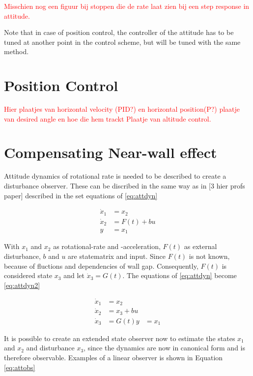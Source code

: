 \textcolor{red}{Misschien nog een figuur bij stoppen die de rate laat zien bij een step response in attitude.}

Note that in case of position control, the controller of the attitude has to be tuned at another point in the control scheme, but will be tuned with the same method.

\section{Position Control}
\textcolor{red}{Hier plaatjes van horizontal velocity (PID?) en  horizontal position(P?)}
\textcolor{red}{plaatje van desired angle en hoe die hem trackt}
\textcolor{red}{Plaatje van altitude control.}


\section{Compensating Near-wall effect}
Attitude dynamics of rotational rate is needed to be described to create a disturbance observer. These can be discribed in the same way as in [3 hier profs paper] described in the set equations of \ref{eq:attdyn}

\begin{equation} \label{eq:attdyn}
\begin{aligned}
\dot{x}_1 &= x_2 \\
\dot{x}_2 &= F(t)+bu \\
y 		  &=x_1 
\end{aligned}
\end{equation}

With $x_1$ and $x_2$ as rotational-rate and -acceleration, $F(t)$ as external disturbance, $b$ and $u$ are statematrix and input. Since $F(t)$ is not known, because of fluctions and dependencies of wall gap. Consequently, $F(t)$ is considered state $x_3$ and let $\dot{x}_3 = G(t)$. The equations of \ref{eq:attdyn} become \ref{eq:attdyn2}

\begin{equation} \label{eq:attdyn2}
\begin{aligned}
\dot{x}_1 &= x_2 \\
\dot{x}_2 &= x_3+bu \\
\dot{x}_3 &= G(t)
y &=x_1 
\end{aligned}
\end{equation}

It is possible to create an extended state observer now to estimate the states $x_1$ and $x_2$ and disturbance $x_3$, since the dynamics are now in canonical form and is therefore observable. Examples of a linear observer is shown in Equation \ref{eq:attobs}

